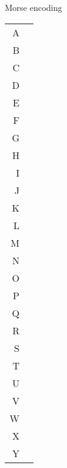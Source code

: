 \begin{margintable}
	\footnotesize
	\centering
	\caption{Morse encoding}

	\label{tab:morse}
	\begin{tabular}{rl}
		\mst A & \morsedot \morsedash                       \\
		\mst B & \morsedash \morsedot \morsedot \morsedot   \\
		\mst C & \morsedash \morsedot \morsedash \morsedot  \\
		\mst D & \morsedash \morsedot \morsedot             \\
		\mst E & \morsedot                                  \\
		\mst F & \morsedot \morsedot \morsedash \morsedot   \\
		\mst G & \morsedash \morsedash \morsedot            \\
		\mst H & \morsedot \morsedot \morsedot \morsedot    \\
		\mst I & \morsedot \morsedot                        \\
		\mst J & \morsedot \morsedash \morsedash \morsedash \\
		\mst K & \morsedash \morsedot \morsedash            \\
		\mst L & \morsedot \morsedash \morsedot \morsedot   \\
		\mst M & \morsedash \morsedash                      \\
		\mst N & \morsedash \morsedot                       \\
		\mst O & \morsedash \morsedash \morsedash           \\
		\mst P & \morsedot \morsedash \morsedash \morsedot  \\
		\mst Q & \morsedash \morsedash \morsedot \morsedash \\
		\mst R & \morsedot \morsedash \morsedot             \\
		\mst S & \morsedot \morsedot \morsedot              \\
		\mst T & \morsedash                                 \\
		\mst U & \morsedot \morsedot \morsedash             \\
		\mst V & \morsedot \morsedot \morsedot \morsedash   \\
		\mst W & \morsedot \morsedash \morsedash            \\
		\mst X & \morsedash \morsedot \morsedot \morsedash  \\
		\mst Y & \morsedash \morsedot \morsedash \morsedash \\

\end{tabular}
\end{margintable}
